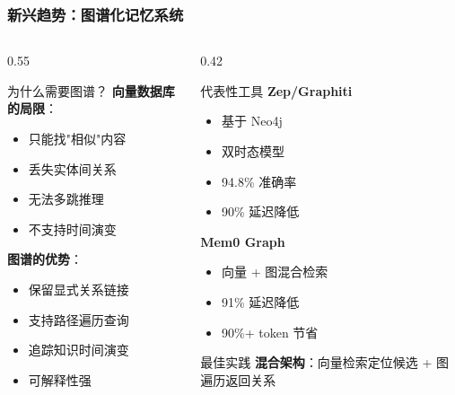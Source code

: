 \documentclass[aspectratio=169,10pt]{beamer}
\begin{document}
\begin{frame}
  \frametitle{新兴趋势：图谱化记忆系统}

  \begin{columns}[T]
    \begin{column}{0.55\textwidth}
      \begin{block}{为什么需要图谱？}
        \footnotesize
        \textbf{向量数据库的局限}：
        \begin{itemize}
          \item 只能找"相似"内容
          \item 丢失实体间关系
          \item 无法多跳推理
          \item 不支持时间演变
        \end{itemize}

        \vspace{0.2cm}

        \textbf{图谱的优势}：
        \begin{itemize}
          \item 保留显式关系链接
          \item 支持路径遍历查询
          \item 追踪知识时间演变
          \item 可解释性强
        \end{itemize}
      \end{block}
    \end{column}

    \begin{column}{0.42\textwidth}
      \begin{block}{代表性工具}
        \footnotesize
        \textbf{Zep/Graphiti}
        \begin{itemize}
          \item 基于 Neo4j
          \item 双时态模型
          \item 94.8\% 准确率
          \item 90\% 延迟降低
        \end{itemize}

        \vspace{0.2cm}

        \textbf{Mem0 Graph}
        \begin{itemize}
          \item 向量 + 图混合检索
          \item 91\% 延迟降低
          \item 90\%+ token 节省
        \end{itemize}
      \end{block}

      \vspace{0.2cm}

      \begin{alertblock}{最佳实践}
        \tiny
        \textbf{混合架构}：向量检索定位候选 + 图遍历返回关系
      \end{alertblock}
    \end{column}
  \end{columns}
\end{frame}
\end{document}
